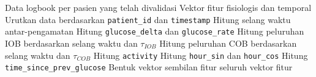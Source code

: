 \begin{algorithm}[h]
    \caption{Rekayasa Fitur Berbasis Fisiologi dan Temporal}
    \label{alg:alg5.1_rekayasa_fitur}
    \begin{algorithmic}[1]
        \Require Data logbook per pasien yang telah divalidasi
        \Ensure Vektor fitur fisiologis dan temporal
        \State Urutkan data berdasarkan \texttt{patient\_id} dan \texttt{timestamp}
            \State Hitung selang waktu antar-pengamatan
            \State Hitung \texttt{glucose\_delta} dan \texttt{glucose\_rate}
            \State Hitung peluruhan IOB berdasarkan selang waktu dan $\tau_{IOB}$
            \State Hitung peluruhan COB berdasarkan selang waktu dan $\tau_{COB}$
            \State Hitung \texttt{activity}
            \State Hitung \texttt{hour\_sin} dan \texttt{hour\_cos}
            \State Hitung \texttt{time\_since\_prev\_glucose}
            \State Bentuk vektor sembilan fitur
        \EndFor
        \State \Return seluruh vektor fitur
    \end{algorithmic}
\end{algorithm}
